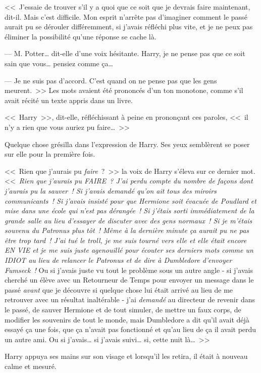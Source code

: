<<~J'essaie de trouver s'il y a quoi que ce soit que je devrais faire maintenant, dit-il. Mais c'est difficile. Mon esprit n'arrête pas d'imaginer comment le passé aurait pu se dérouler différemment, si j'avais réfléchi plus vite, et je ne peux pas éliminer la possibilité qu'une réponse se cache là.

--- M. Potter… dit-elle d'une voix hésitante. Harry, je ne pense pas que ce soit sain que vous… pensiez comme ça…

--- Je ne suis pas d'accord. C'est quand on ne pense pas que les gens meurent.~>> Les mots avaient été prononcés d'un ton monotone, comme s'il avait récité un texte appris dans un livre.

<<~Harry~>>, dit-elle, réfléchissant à peine en prononçant ces paroles, <<~il n'y a rien que vous auriez pu faire…~>>

Quelque chose grésilla dans l'expression de Harry. Ses yeux semblèrent se poser sur elle pour la première fois.

<<~Rien que j'aurais pu \emph{faire}~?~>> la voix de Harry s'éleva sur ce dernier mot. <<~\emph{Rien que j'aurais pu FAIRE~? J'ai perdu compte du nombre de façons dont j'aurais pu la sauver~! Si j'avais demandé qu'on ait tous des miroirs communicants~! Si j'avais insisté pour que Hermione soit évacuée de Poudlard et mise dans une école qui n'est pas dérangée~! Si j'étais sorti immédiatement de la grande salle au lieu d'essayer de discuter avec des gens normaux~! Si je m'étais souvenu du Patronus plus tôt~! Même à la dernière minute ça aurait pu ne pas être trop tard~! J'ai tué le troll, je me suis tourné vers elle et elle était encore EN VIE et je me suis juste agenouillé pour écouter ses derniers mots comme un IDIOT au lieu de relancer le Patronus et de dire à Dumbledore d'envoyer Fumseck~!} Ou si j'avais juste vu tout le problème sous un autre angle - si j'avais cherché un élève avec un Retourneur de Temps pour envoyer un message dans le passé \emph{avant} que je découvre si quelque chose lui était arrivé au lieu de me retrouver avec un résultat inaltérable - j'ai \emph{demandé} au directeur de revenir dans le passé, de sauver Hermione et de tout simuler, de mettre un faux corps, de modifier les souvenirs de tout le monde, mais Dumbledore a dit qu'il avait déjà essayé ça une fois, que ça n'avait pas fonctionné et qu'au lieu de ça il avait perdu un autre ami. Ou si j'avais… si j'avais suivi… si, cette nuit là…~>>

Harry appuya ses mains sur son visage et lorsqu'il les retira, il était à nouveau calme et mesuré.

